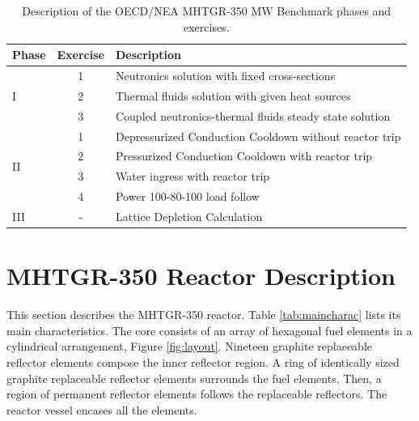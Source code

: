 \begin{table}[htbp!]
  \centering
  \caption{Description of the OECD/NEA MHTGR-350 MW Benchmark phases and exercises.}
  \begin{tabular}{lcl}
\toprule
Phase               & Exercise & Description                                             \\
\midrule
\multirow{3}{*}{I}  & 1        & Neutronics solution with fixed cross-sections           \\
                    & 2        & Thermal fluids solution with given heat sources         \\
                    & 3        & Coupled neutronics-thermal fluids steady state solution \\
\midrule
\multirow{4}{*}{II} & 1        & Depressurized Conduction Cooldown without reactor trip  \\
                    & 2        & Pressurized Conduction Cooldown with reactor trip       \\
                    & 3        & Water ingress with reactor trip                         \\
                    & 4        & Power 100-80-100 load follow                            \\
\midrule
III                 & -        & Lattice Depletion Calculation                           \\
\bottomrule
  \end{tabular}
  \label{tab:benchmark}
\end{table}

\section{MHTGR-350 Reactor Description}
\label{sec:ch3-mhtgr}

This section describes the \gls{MHTGR}-350 reactor.
Table \ref{tab:maincharac} lists its main characteristics.
The core consists of an array of hexagonal fuel elements in a cylindrical arrangement, Figure \ref{fig:layout}.
Nineteen graphite replaceable reflector elements compose the inner reflector region.
A ring of identically sized graphite replaceable reflector elements surrounds the fuel elements.
Then, a region of permanent reflector elements follows the replaceable reflectors.
The reactor vessel encases all the elements.

